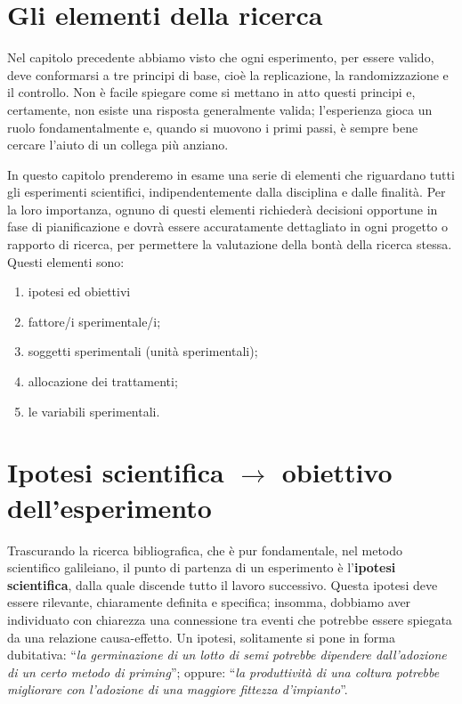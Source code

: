\documentclass[
  12pt,
]{book}
\providecommand{\tightlist}{%
  \setlength{\itemsep}{0pt}\setlength{\parskip}{0pt}}
\begin{document}
\hypertarget{gli-elementi-della-ricerca}{%
\section{Gli elementi della ricerca}\label{gli-elementi-della-ricerca}}

Nel capitolo precedente abbiamo visto che ogni esperimento, per essere valido, deve conformarsi a tre principi di base, cioè la replicazione, la randomizzazione e il controllo. Non è facile spiegare come si mettano in atto questi principi e, certamente, non esiste una risposta generalmente valida; l'esperienza gioca un ruolo fondamentalmente e, quando si muovono i primi passi, è sempre bene cercare l'aiuto di un collega più anziano.

In questo capitolo prenderemo in esame una serie di elementi che riguardano tutti gli esperimenti scientifici, indipendentemente dalla disciplina e dalle finalità. Per la loro importanza, ognuno di questi elementi richiederà decisioni opportune in fase di pianificazione e dovrà essere accuratamente dettagliato in ogni progetto o rapporto di ricerca, per permettere la valutazione della bontà della ricerca stessa. Questi elementi sono:

\begin{enumerate}
\def\labelenumi{\arabic{enumi}.}
\tightlist
\item
  ipotesi ed obiettivi
\item
  fattore/i sperimentale/i;
\item
  soggetti sperimentali (unità sperimentali);
\item
  allocazione dei trattamenti;
\item
  le variabili sperimentali.
\end{enumerate}

\hypertarget{ipotesi-scientifica-rightarrow-obiettivo-dellesperimento}{%
\section{\texorpdfstring{Ipotesi scientifica \(\rightarrow\) obiettivo dell'esperimento}{Ipotesi scientifica \textbackslash rightarrow obiettivo dell'esperimento}}\label{ipotesi-scientifica-rightarrow-obiettivo-dellesperimento}}

Trascurando la ricerca bibliografica, che è pur fondamentale, nel metodo scientifico galileiano, il punto di partenza di un esperimento è l'\textbf{ipotesi scientifica}, dalla quale discende tutto il lavoro successivo. Questa ipotesi deve essere rilevante, chiaramente definita e specifica; insomma, dobbiamo aver individuato con chiarezza una connessione tra eventi che potrebbe essere spiegata da una relazione causa-effetto. Un ipotesi, solitamente si pone in forma dubitativa: ``\emph{la germinazione di un lotto di semi potrebbe dipendere dall'adozione di un certo metodo di priming}''; oppure: ``\emph{la produttività di una coltura potrebbe migliorare con l'adozione di una maggiore fittezza d'impianto}''.
\end{document}

